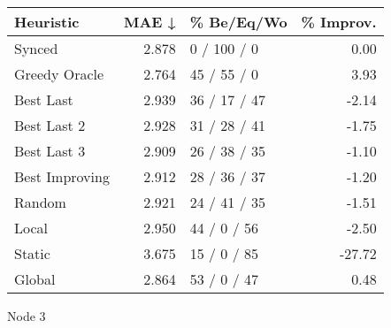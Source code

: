 \begin{tabular}{lrlr}
\toprule
\textbf{Heuristic} & \textbf{MAE ↓} & \textbf{\% Be/Eq/Wo} & \textbf{\% Improv.} \\
\midrule
            Synced &          2.878 &          0 / 100 / 0 &                0.00 \\
     Greedy Oracle &          2.764 &          45 / 55 / 0 &                3.93 \\
         Best Last &          2.939 &         36 / 17 / 47 &               -2.14 \\
       Best Last 2 &          2.928 &         31 / 28 / 41 &               -1.75 \\
       Best Last 3 &          2.909 &         26 / 38 / 35 &               -1.10 \\
    Best Improving &          2.912 &         28 / 36 / 37 &               -1.20 \\
            Random &          2.921 &         24 / 41 / 35 &               -1.51 \\
             Local &          2.950 &          44 / 0 / 56 &               -2.50 \\
            Static &          3.675 &          15 / 0 / 85 &              -27.72 \\
            Global &          2.864 &          53 / 0 / 47 &                0.48 \\
\bottomrule
\end{tabular}
\caption{Node 3}
\label{tab:hr_non_lr05_le1_bs2_3}

